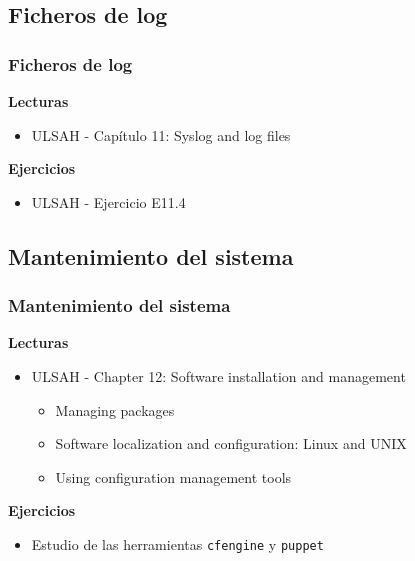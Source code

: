 \documentclass{beamer}
\begin{document}
\subsection{Ficheros de log}
\begin{frame}
  \frametitle{Ficheros de log}
  \textbf{Lecturas}
  \begin{itemize}
    \item ULSAH - Capítulo 11: Syslog and log files
  \end{itemize}
  \vspace{1cm}
  \textbf{Ejercicios}
  \begin{itemize}
    \item ULSAH - Ejercicio E11.4
  \end{itemize}
\end{frame}

\subsection{Mantenimiento del sistema}
\begin{frame}
  \frametitle{Mantenimiento del sistema}
  \textbf{Lecturas}
  \begin{itemize}
    \item ULSAH - Chapter 12: Software installation and management
      \begin{itemize}
        \item Managing packages
        \item Software localization and configuration: Linux and UNIX
        \item Using configuration management tools
      \end{itemize}
  \end{itemize}
  \vspace{1cm}
  \textbf{Ejercicios}
  \begin{itemize}
    \item Estudio de las herramientas \texttt{cfengine} y \texttt{puppet}
  \end{itemize}
\end{frame}


\end{document}
